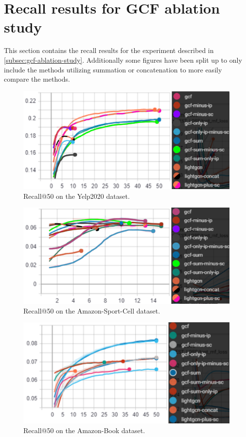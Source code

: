 \section{Recall results for GCF ablation study}\label{app:recall-results-gcf-ablation}
This section contains the recall results for the experiment described in \autoref{subsec:gcf-ablation-study}.
Additionally some figures have been split up to only include the methods utilizing summation or concatenation to more easily compare the methods.
\begin{figure}[h!]
    \includegraphics[width=\linewidth]{figures/gcf-all-recall.png}
    \caption{Recall@50 on the Yelp2020 dataset.}
    \label{fig:GCF-recall-ablation-study}
\end{figure}
\begin{figure}[h!]
    \includegraphics[width=\linewidth]{figures/amazon-cell-sport-gcf-all-recall.png}
    \caption{Recall@50 on the Amazon-Sport-Cell dataset.}
    \label{fig:GCF-recall-ablation-study-amazon-cell-sport}
\end{figure}
\begin{figure}[h!]
    \includegraphics[width=\linewidth]{figures/amazon-book-gcf-all-recall.png}
    \caption{Recall@50 on the Amazon-Book dataset.}
    \label{fig:GCF-recall-ablation-study-amazon-book}
\end{figure}
